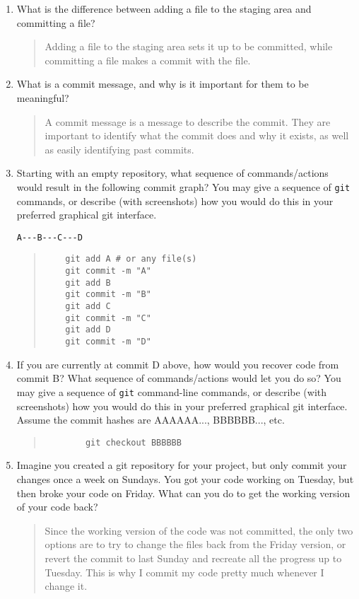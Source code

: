 \documentclass[10pt,twocolumn]{article}
\begin{document}
\begin{enumerate}
\item What is the difference between adding a file to the staging area and committing a file?
    \begin{quote}
        Adding a file to the staging area sets it up to be committed, while
        committing a file makes a commit with the file.
    \end{quote}
\item What is a commit message, and why is it important for them to be meaningful?
    \begin{quote}
        A commit message is a message to describe the commit. They are important
        to identify what the commit does and why it exists, as well as easily
        identifying past commits.
    \end{quote}
\item Starting with an empty repository, what sequence of commands/actions would result in the following commit graph? You may give a sequence of \texttt{git} commands, or describe (with screenshots) how you would do this in your preferred graphical git interface.
\begin{verbatim}
A---B---C---D
\end{verbatim}
\begin{quote}
    \begin{verbatim}
    git add A # or any file(s)
    git commit -m "A"
    git add B
    git commit -m "B"
    git add C
    git commit -m "C"
    git add D
    git commit -m "D"
    \end{verbatim}
\end{quote}
\item If you are currently at commit D above, how would you recover code from commit B? What sequence of commands/actions would let you do so? You may give a sequence of \texttt{git} command-line commands, or describe (with screenshots) how you would do this in your preferred graphical git interface. Assume the commit hashes are AAAAAA..., BBBBBB..., etc.
    \begin{quote}
        \begin{verbatim}
        git checkout BBBBBB
        \end{verbatim}
    \end{quote}
\item Imagine you created a git repository for your project, but only commit your changes once a week on Sundays. You got your code working on Tuesday, but then broke your code on Friday. What can you do to get the working version of your code back?
    \begin{quote}
        Since the working version of the code was not committed,
        the only two options are to try to change the files back from the Friday
        version, or revert the commit to last Sunday and recreate all the
        progress up to Tuesday. This is why I commit my code pretty much
        whenever I change it.
    \end{quote}
\end{enumerate}
\end{document}
